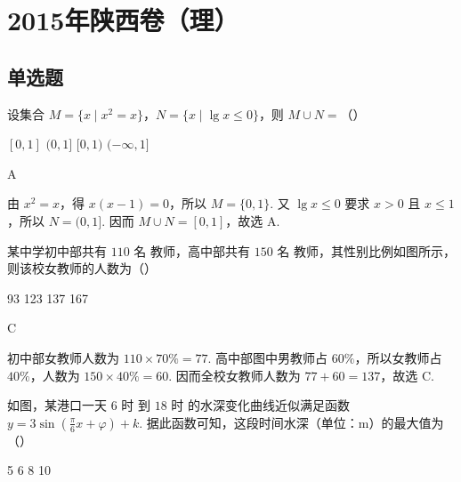 \chapter{2015年陕西卷（理）}

\section{单选题}

\begin{problem}
设集合 \(M = \{x \mid x^2 = x\}\)，\(N = \{x \mid \lg x \leqslant 0\}\)，则 \(M \cup N =\)（\quad）

\choices
    {\([0,1]\)}
    {\((0,1]\)}
    {\([0,1)\)}
    {\((-\infty, 1]\)}
\end{problem}

\begin{answer}
A
\end{answer}

\begin{solution}
由 \(x^{2}=x\)，得 \(x(x-1)=0\)，所以 \(M=\{0,1\}\). 又 \(\lg x\leqslant0\) 要求 \(x>0\) 且 \(x\leqslant1\)，所以 \(N=(0,1]\). 因而 \(M\cup N=[0,1]\)，故选 A.
\end{solution}

\begin{problem}
某中学初中部共有 \(110\text{ 名}\) 教师，高中部共有 \(150\text{ 名}\) 教师，其性别比例如图所示，则该校女教师的人数为（\quad）


\choices
    {93}
    {123}
    {137}
    {167}
\end{problem}

\begin{answer}
C
\end{answer}

\begin{solution}
初中部女教师人数为 \(110\times70\%=77\). 高中部图中男教师占 \(60\%\)，所以女教师占 \(40\%\)，人数为 \(150\times40\%=60\). 因而全校女教师人数为 \(77+60=137\)，故选 C.
\end{solution}

\begin{problem}
如图，某港口一天 \(6\text{ 时}\) 到 \(18\text{ 时}\) 的水深变化曲线近似满足函数 \(y = 3\sin \left(\frac{\pi}{6} x + \varphi\right) + k\). 据此函数可知，这段时间水深（单位：\(\mathrm{m}\)）的最大值为（\quad）


\choices
    {5}
    {6}
    {8}
    {10}
\end{problem}

